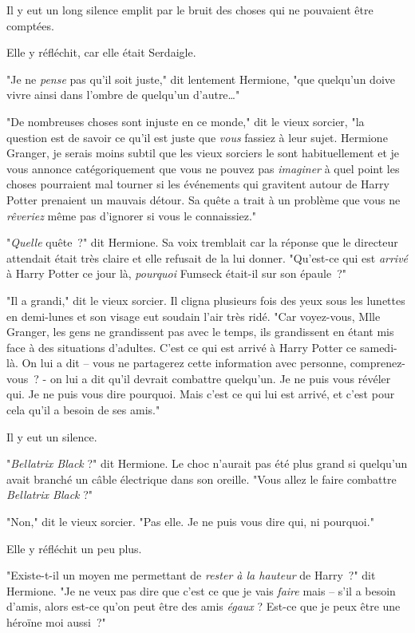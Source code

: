 Il y eut un long silence emplit par le bruit des choses qui ne pouvaient être comptées.

Elle y réfléchit, car elle était Serdaigle.

"Je ne \emph{pense} pas qu'il soit juste," dit lentement Hermione, "que quelqu'un doive vivre ainsi dans l'ombre de quelqu'un d'autre…"

"De nombreuses choses sont injuste en ce monde," dit le vieux sorcier, "la question est de savoir ce qu'il est juste que \emph{vous} fassiez à leur sujet. Hermione Granger, je serais moins subtil que les vieux sorciers le sont habituellement et je vous annonce catégoriquement que vous ne pouvez pas \emph{imaginer} à quel point les choses pourraient mal tourner si les événements qui gravitent autour de Harry Potter prenaient un mauvais détour. Sa quête a trait à un problème que vous ne \emph{rêveriez} même pas d'ignorer si vous le connaissiez."

"\emph{Quelle} quête~?" dit Hermione. Sa voix tremblait car la réponse que le directeur attendait était très claire et elle refusait de la lui donner. "Qu'est-ce qui est \emph{arrivé} à Harry Potter ce jour là, \emph{pourquoi} Fumseck était-il sur son épaule~?"

"Il a grandi," dit le vieux sorcier. Il cligna plusieurs fois des yeux sous les lunettes en demi-lunes et son visage eut soudain l'air très ridé. "Car voyez-vous, Mlle Granger, les gens ne grandissent pas avec le temps, ils grandissent en étant mis face à des situations d'adultes. C'est ce qui est arrivé à Harry Potter ce samedi-là. On lui a dit -- vous ne partagerez cette information avec personne, comprenez-vous~? - on lui a dit qu'il devrait combattre quelqu'un. Je ne puis vous révéler qui. Je ne puis vous dire pourquoi. Mais c'est ce qui lui est arrivé, et c'est pour cela qu'il a besoin de ses amis."

Il y eut un silence.

"\emph{Bellatrix Black} ?" dit Hermione. Le choc n'aurait pas été plus grand si quelqu'un avait branché un câble électrique dans son oreille. "Vous allez le faire combattre \emph{Bellatrix Black} ?"

"Non," dit le vieux sorcier. "Pas elle. Je ne puis vous dire qui, ni pourquoi."

Elle y réfléchit un peu plus.

"Existe-t-il un moyen me permettant de \emph{rester à la hauteur} de Harry~?" dit Hermione. "Je ne veux pas dire que c'est ce que je vais \emph{faire} mais -- s'il a besoin d'amis, alors est-ce qu'on peut être des amis \emph{égaux} ? Est-ce que je peux être une héroïne moi aussi~?"

